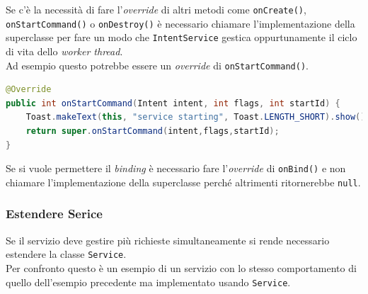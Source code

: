 \documentclass{book}
\begin{document}
Se c'è la necessità di fare l'\textit{override} di altri metodi come \texttt{onCreate()}, \texttt{onStartCommand()} o \texttt{onDestroy()} è necessario chiamare l'implementazione della superclasse per fare un modo che \texttt{IntentService} gestica oppurtunamente il ciclo di vita dello \textit{worker thread}.\\
Ad esempio questo potrebbe essere un \textit{override} di \texttt{onStartCommand()}.
\begin{lstlisting}[language=Java]
@Override
public int onStartCommand(Intent intent, int flags, int startId) {
    Toast.makeText(this, "service starting", Toast.LENGTH_SHORT).show();
    return super.onStartCommand(intent,flags,startId);
}
\end{lstlisting}

Se si vuole permettere il \textit{binding} è necessario fare l'\textit{override} di \texttt{onBind()} e non chiamare l'implementazione della superclasse perché altrimenti ritornerebbe \texttt{null}.\\


\subsubsection{Estendere Serice}
Se il servizio deve gestire più richieste simultaneamente si rende necessario estendere la classe \texttt{Service}.\\
Per confronto questo è un esempio di un servizio con lo stesso comportamento di quello dell'esempio precedente ma implementato usando \texttt{Service}.
\end{document}
